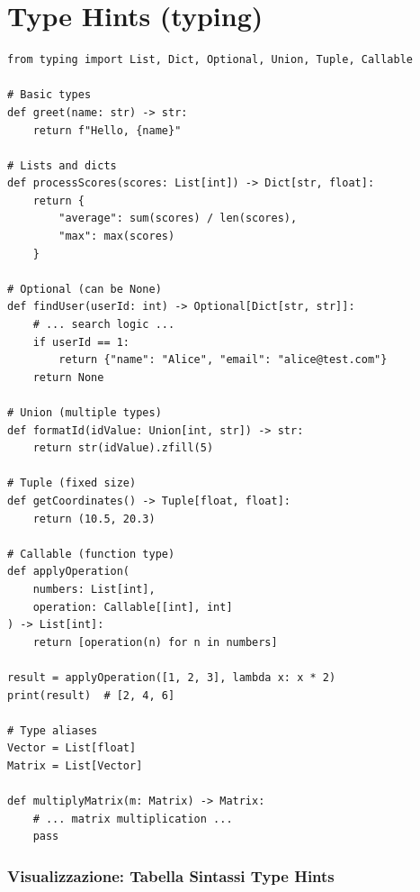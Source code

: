 \section{Type Hints (typing)}

\begin{lstlisting}
from typing import List, Dict, Optional, Union, Tuple, Callable

# Basic types
def greet(name: str) -> str:
    return f"Hello, {name}"

# Lists and dicts
def processScores(scores: List[int]) -> Dict[str, float]:
    return {
        "average": sum(scores) / len(scores),
        "max": max(scores)
    }

# Optional (can be None)
def findUser(userId: int) -> Optional[Dict[str, str]]:
    # ... search logic ...
    if userId == 1:
        return {"name": "Alice", "email": "alice@test.com"}
    return None

# Union (multiple types)
def formatId(idValue: Union[int, str]) -> str:
    return str(idValue).zfill(5)

# Tuple (fixed size)
def getCoordinates() -> Tuple[float, float]:
    return (10.5, 20.3)

# Callable (function type)
def applyOperation(
    numbers: List[int],
    operation: Callable[[int], int]
) -> List[int]:
    return [operation(n) for n in numbers]

result = applyOperation([1, 2, 3], lambda x: x * 2)
print(result)  # [2, 4, 6]

# Type aliases
Vector = List[float]
Matrix = List[Vector]

def multiplyMatrix(m: Matrix) -> Matrix:
    # ... matrix multiplication ...
    pass
\end{lstlisting}

\subsubsection{Visualizzazione: Tabella Sintassi Type Hints}

